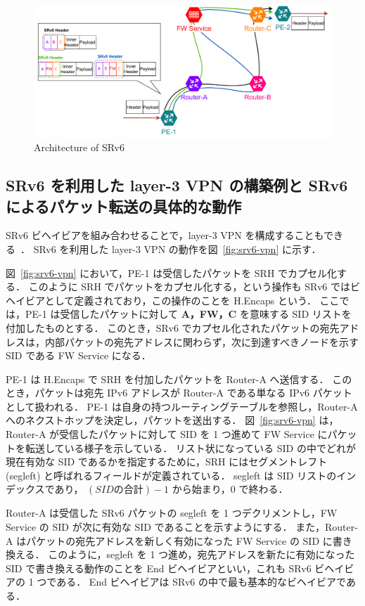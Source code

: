 \begin{figure}[t]
    \centering
    \includegraphics[width=0.95\linewidth]{img/SRv6Arch.pdf}
    \caption{Architecture of SRv6}
    \label{fig:srv6}
\end{figure}

\subsection*{SRv6 を利用した layer-3 VPN の構築例と SRv6 によるパケット転送の具体的な動作}
\label{sbsection:srv6-vpn}

SRv6 ビヘイビアを組み合わせることで，layer-3 VPN を構成することもできる~\cite{rfc9252}．
SRv6 を利用した layer-3 VPN の動作を図~\ref*{fig:srv6-vpn} に示す．

図~\ref*{fig:srv6-vpn}  において，PE-1 は受信したパケットを SRH でカプセル化する．
このように SRH でパケットをカプセル化する，という操作も SRv6 ではビヘイビアとして定義されており，この操作のことを H.Encaps という．
ここでは，PE-1 は受信したパケットに対して \textbf{A，FW，C} を意味する SID リストを付加したものとする．
このとき，SRv6 でカプセル化されたパケットの宛先アドレスは，内部パケットの宛先アドレスに関わらず，次に到達すべきノードを示す SID である FW Service になる．

PE-1 は H.Encaps で SRH を付加したパケットを Router-A へ送信する．
このとき，パケットは宛先 IPv6 アドレスが Router-A である単なる IPv6 パケットとして扱われる．
PE-1 は自身の持つルーティングテーブルを参照し，Router-A へのネクストホップを決定し，パケットを送出する．
図~\ref*{fig:srv6-vpn}  は，Router-A が受信したパケットに対して SID を 1 つ進めて FW Service にパケットを転送している様子を示している．
リスト状になっている SID の中でどれが現在有効な SID であるかを指定するために，SRH にはセグメントレフト (segleft) と呼ばれるフィールドが定義されている．
segleft は SID リストのインデックスであり， $(SID の合計)-1$ から始まり，$0$ で終わる．

Router-A は受信した SRv6 パケットの segleft を 1 つデクリメントし，FW Service の SID が次に有効な SID であることを示すようにする．
また，Router-A はパケットの宛先アドレスを新しく有効になった FW Service の SID に書き換える．
このように，segleft を 1 つ進め，宛先アドレスを新たに有効になった SID で書き換える動作のことを End ビヘイビアといい，これも SRv6 ビヘイビアの 1 つである．
End ビヘイビアは SRv6 の中で最も基本的なビヘイビアである．

